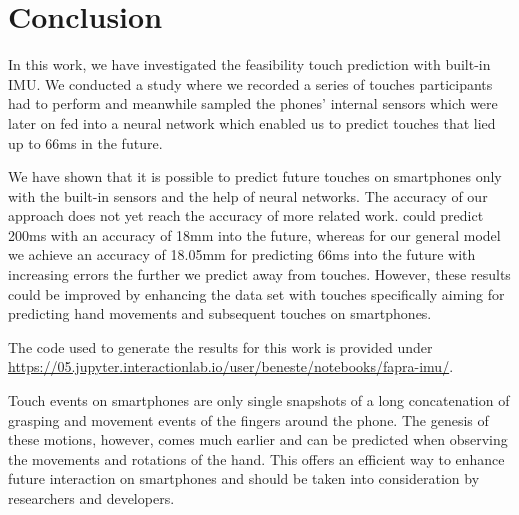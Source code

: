 \section{Conclusion}
In this work, we have investigated the feasibility touch prediction with built-in IMU. 
We conducted a study where we recorded a series of touches participants had to perform and meanwhile sampled the phones' internal sensors which were later on fed into a neural network which enabled us to predict touches that lied up to 66ms in the future.

We have shown that it is possible to predict future touches on smartphones only with the built-in sensors and the help of neural networks.
The accuracy of our approach does not yet reach the accuracy of more related work. 
\citeauthor{MohdNoor2016} \cite{MohdNoor2016} could predict 200ms with an accuracy of 18mm into the future, whereas for our general model we achieve an accuracy of 18.05mm for predicting 66ms into the future with increasing errors the further we predict away from touches.
However, these results could be improved by enhancing the data set with touches specifically aiming for predicting hand movements and subsequent touches on smartphones.

\begin{sidebar}
	The code used to generate the results for this work is provided under \url{https://05.jupyter.interactionlab.io/user/beneste/notebooks/fapra-imu/}.
\end{sidebar}

Touch events on smartphones are only single snapshots of a long concatenation of grasping and movement events of the fingers around the phone. 
The genesis of these motions, however, comes much earlier and can be predicted when observing the movements and rotations of the hand.
This offers an efficient way to enhance future interaction on smartphones and should be taken into consideration by researchers and developers.
